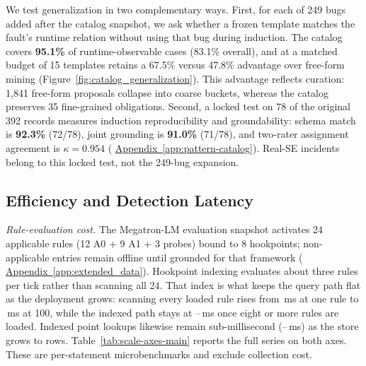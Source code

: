 \documentclass[sigconf,nonacm]{acmart}
\newcommand{\suppappendix}[1]{%
  \href{https://github.com/vivia-an/trainaudit-vldb-artifact/blob/vldb-2027-artifact-v1.0.1/paper/appendix_supplement.pdf}%
  {Appendix~\ref*{#1}}}
\begin{document}
We test generalization in two complementary ways. First, for each of 249 bugs
added after the catalog snapshot, we ask whether a frozen template matches the
fault's runtime relation without using that bug during induction. The catalog
covers \textbf{95.1\%} of runtime-observable cases (83.1\% overall), and at a
matched budget of 15 templates retains a 67.5\% versus 47.8\% advantage over
free-form mining (Figure~\ref{fig:catalog_generalization}). This advantage
reflects curation: 1{,}841 free-form proposals collapse into coarse buckets,
whereas the catalog preserves 35 fine-grained obligations. Second, a locked
test on 78 of the original 392 records measures induction reproducibility and
groundability: schema match is \textbf{92.3\%} (72/78), joint grounding is
\textbf{91.0\%} (71/78), and two-rater assignment agreement is
$\kappa{=}0.954$ (\suppappendix{app:pattern-catalog}). Real-SE incidents belong
to this locked test, not the 249-bug expansion.

\subsection{Efficiency and Detection Latency}
\label{subsec:efficiency}

\noindent\emph{Rule-evaluation cost.}
The Megatron-LM evaluation snapshot activates 24 applicable rules
(12 A0 + 9 A1 + 3 probes) bound to 8 hookpoints; non-applicable entries remain
offline until grounded for that framework
(\suppappendix{app:extended_data}). Hookpoint indexing evaluates about three
rules per tick rather than scanning all 24.
That index is what keeps the query path flat as the deployment grows: scanning
every loaded rule rises from \ScanMsOne\,ms at one rule to
\ScanMsHundred\,ms at 100, while the indexed path stays at
\IdxMsEight--\IdxMsHundred\,ms once eight or more rules are loaded. Indexed
point lookups likewise remain sub-millisecond
(\QueryPointLo--\QueryPointHi\,ms) as the store grows to \QueryRowsHi{} rows.
Table~\ref{tab:scale-axes-main} reports the full series on both axes. These are
per-statement microbenchmarks and exclude collection cost.
\end{document}
